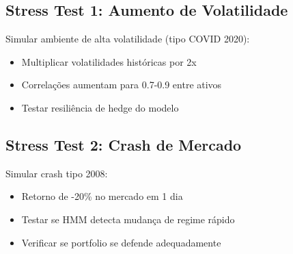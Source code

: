 \documentclass[12pt,a4paper]{article}
\begin{document}
\subsection{Stress Test 1: Aumento de Volatilidade}

Simular ambiente de alta volatilidade (tipo COVID 2020):
\begin{itemize}
    \item Multiplicar volatilidades históricas por 2x
    \item Correlações aumentam para 0.7-0.9 entre ativos
    \item Testar resiliência de hedge do modelo
\end{itemize}

\subsection{Stress Test 2: Crash de Mercado}

Simular crash tipo 2008:
\begin{itemize}
    \item Retorno de -20\% no mercado em 1 dia
    \item Testar se HMM detecta mudança de regime rápido
    \item Verificar se portfolio se defende adequadamente
\end{itemize}
\end{document}
